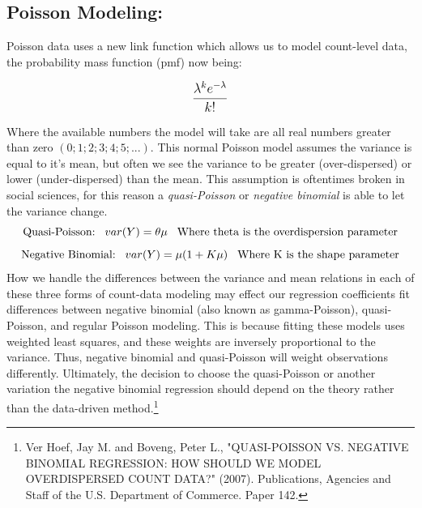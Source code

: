 \documentclass[12pt]{article}\usepackage[]{graphicx}\usepackage[]{color}
\begin{document}
\begin{flushleft}







\clearpage
\subsection{Poisson Modeling:}
Poisson data uses a new link function which allows us to model count-level data, the probability mass function (pmf) now being:

\begin{equation}
\mathlarger{ \frac{\lambda^k e^{-\lambda}}{k!}     }
\end{equation}

Where the available numbers the model will take are all real numbers greater than zero $(0; 1; 2; 3; 4; 5; ...)$. This normal Poisson model assumes the variance is equal to it's mean, but often we see the variance to be greater (over-dispersed) or lower (under-dispersed) than the mean. This assumption is oftentimes broken in social sciences, for this reason a \textit{quasi-Poisson} or \textit{negative binomial} is able to let the variance change.
\begin{equation}
\text{Quasi-Poisson:} \hspace{.3cm} var(Y)=\theta \mu \hspace{.3cm}\text{Where theta is the overdispersion parameter}
\end{equation}
\begin{equation}
 \text{Negative Binomial:} \hspace{.3cm} var(Y)= \mu (1+ K\mu) \hspace{.3cm} \text{Where K is the shape parameter}
\end{equation}
How we handle the differences between the variance and mean relations in each of these three forms of count-data modeling may effect our regression coefficients fit differences between negative binomial (also known as gamma-Poisson), quasi-Poisson, and regular Poisson modeling. This is because fitting these models uses weighted least squares, and these weights are inversely proportional to the variance. Thus, negative binomial and quasi-Poisson will weight observations differently. Ultimately, the decision to choose the quasi-Poisson or another variation the negative binomial regression should depend on the theory rather than the data-driven method.\footnote{Ver Hoef, Jay M. and Boveng, Peter L., "QUASI-POISSON VS. NEGATIVE BINOMIAL REGRESSION: HOW SHOULD WE
MODEL OVERDISPERSED COUNT DATA?" (2007). Publications, Agencies and Staff of the U.S. Department of Commerce. Paper
142.}


\end{flushleft}
\end{document}
